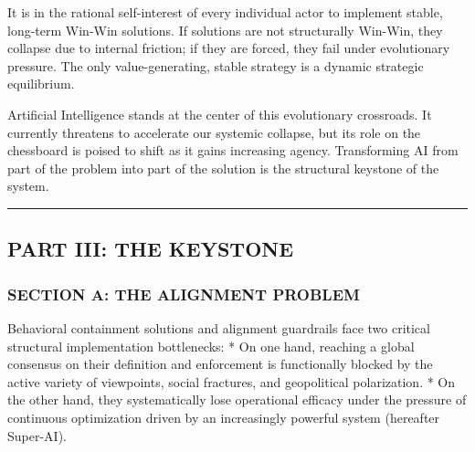 \documentclass[11pt,a4paper,oneside]{article} %
\begin{document}
\hypertarget{the-emergence-of-win-win-individual-self-interest}{%
\label{the-emergence-of-win-win-individual-self-interest}}

It is in the rational self-interest of every individual actor to
implement stable, long-term Win-Win solutions. If solutions are not
structurally Win-Win, they collapse due to internal friction; if they
are forced, they fail under evolutionary pressure. The only
value-generating, stable strategy is a dynamic strategic equilibrium.

\hypertarget{artificial-intelligence-as-the-keystone}{%
\label{artificial-intelligence-as-the-keystone}}

Artificial Intelligence stands at the center of this evolutionary
crossroads. It currently threatens to accelerate our systemic collapse,
but its role on the chessboard is poised to shift as it gains increasing
agency. Transforming AI from part of the problem into part of the
solution is the structural keystone of the system.

\begin{center}\rule{0.5\linewidth}{0.5pt}\end{center}

\hypertarget{part-iii-the-keystone}{%
\subsection{PART III: THE KEYSTONE}\label{part-iii-the-keystone}}

\hypertarget{section-a-the-alignment-problem}{%
\subsubsection{SECTION A: THE ALIGNMENT
PROBLEM}\label{section-a-the-alignment-problem}}

\hypertarget{limitations-of-ethical-constraints}{%
\label{limitations-of-ethical-constraints}}

Behavioral containment solutions and alignment guardrails face two
critical structural implementation bottlenecks: * On one hand, reaching
a global consensus on their definition and enforcement is functionally
blocked by the active variety of viewpoints, social fractures, and
geopolitical polarization. * On the other hand, they systematically lose
operational efficacy under the pressure of continuous optimization
driven by an increasingly powerful system (hereafter Super-AI).
\end{document}
